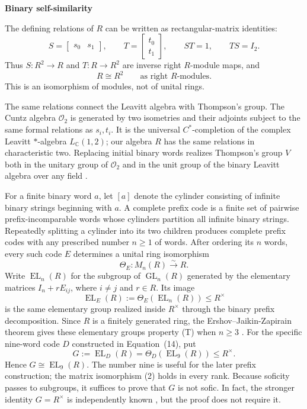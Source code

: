 \documentclass[10pt]{article}
\newcommand{\GL}{\operatorname{GL}}
\newcommand{\EL}{\operatorname{EL}}
\newcommand{\subhead}[1]{\par\medskip\noindent\textbf{#1}\par\smallskip}
\begin{document}
\subhead{Binary self-similarity}
The defining relations of $R$ can be written as rectangular-matrix identities:
\[
S=\begin{bmatrix}s_0&s_1\end{bmatrix},\qquad
T=\begin{bmatrix}t_0\\t_1\end{bmatrix},\qquad
ST=1,\qquad TS=I_2.
\]
Thus $S:R^2\to R$ and $T:R\to R^2$ are inverse right $R$-module maps, and
\[
R\cong R^2\qquad\text{as right $R$-modules}.
\]
This is an isomorphism of modules, not of unital rings.

The same relations connect the Leavitt algebra with Thompson's group. The Cuntz algebra $\mathcal O_2$ is generated by two isometries and their adjoints subject to the same formal relations as $s_i,t_i$. It is the universal $C^\ast$-completion of the complex Leavitt $\ast$-algebra $L_{\mathbb C}(1,2)$; our algebra $R$ has the same relations in characteristic two. Replacing initial binary words realizes Thompson's group $V$ both in the unitary group of $\mathcal O_2$ \cite[Section~4]{HO17} and in the unit group of the binary Leavitt algebra over any field \cite[Section~2.2]{BS16}.

For a finite binary word $a$, let $[a]$ denote the cylinder consisting of infinite binary strings beginning with $a$. A complete prefix code is a finite set of pairwise prefix-incomparable words whose cylinders partition all infinite binary strings. Repeatedly splitting a cylinder into its two children produces complete prefix codes with any prescribed number $n\geq 1$ of words. After ordering its $n$ words, every such code $E$ determines a unital ring isomorphism
\begin{equation}
\Theta_E:M_n(R)\xrightarrow{\sim}R.
\tag{2}
\end{equation}
Write $\EL_n(R)$ for the subgroup of $\GL_n(R)$ generated by the elementary matrices $I_n+rE_{ij}$, where $i\neq j$ and $r\in R$. Its image
\[
\EL_E(R):=\Theta_E(\EL_n(R))\leq R^\times
\]
is the same elementary group realized inside $R^\times$ through the binary prefix decomposition. Since $R$ is a finitely generated ring, the Ershov--Jaikin-Zapirain theorem gives these elementary groups property (T) when $n\geq 3$ \cite[Theorem~1.1]{EJ10}. For the specific nine-word code $D$ constructed in Equation~(14), put
\[
G:=\EL_D(R)=\Theta_D(\EL_9(R))\leq R^\times.
\]
Hence $G\cong\EL_9(R)$. The number nine is useful for the later prefix construction; the matrix isomorphism (2) holds in every rank. Because soficity passes to subgroups, it suffices to prove that $G$ is not sofic. In fact, the stronger identity $G=R^\times$ is independently known \cite[Corollary~4.4]{KT26}, but the proof does not require it.
\end{document}
